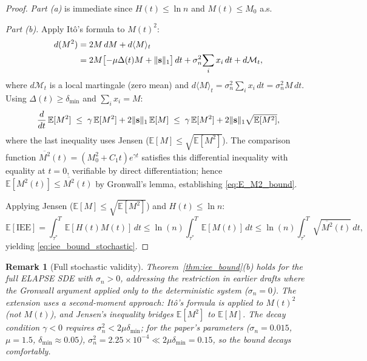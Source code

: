 \documentclass[review,12pt]{elsarticle}
\newcommand{\IEE}{\mathrm{IEE}}
\newtheorem{remark}{Remark}
\begin{document}
\begin{proof}
\emph{Part (a)} is immediate since $H(t) \leq \ln n$ and $M(t) \leq M_0$ a.s.

\emph{Part (b).}
Apply Itô's formula to $M(t)^2$:
\begin{align*}
  d(M^2) &= 2M\,dM + d\langle M\rangle_t \\
  &= 2M\bigl[-\mu\Delta(t)M + \|{\bf s}\|_1\bigr]\,dt
   + \sigma_n^2\!\sum_i x_i\,dt + d\mathcal{M}_t,
\end{align*}
where $d\mathcal{M}_t$ is a local martingale (zero mean) and
$d\langle M\rangle_t = \sigma_n^2\sum_i x_i\,dt = \sigma_n^2 M\,dt$.
Using $\Delta(t) \geq \delta_{\min}$ and $\sum_i x_i = M$:
\[
  \frac{d}{dt}\,\mathbb{E}[M^2]
  \;\leq\; \gamma\,\mathbb{E}[M^2] + 2\|{\bf s}\|_1\,\mathbb{E}[M]
  \;\leq\; \gamma\,\mathbb{E}[M^2] + 2\|{\bf s}\|_1\sqrt{\mathbb{E}[M^2]},
\]
where the last inequality uses Jensen ($\mathbb{E}[M] \leq \sqrt{\mathbb{E}[M^2]}$).
The comparison function $\overline{M^2}(t)=(M_0^2+C_1 t)e^{\gamma t}$
satisfies this differential inequality with equality at $t=0$, verifiable
by direct differentiation; hence $\mathbb{E}[M^2(t)] \leq \overline{M^2}(t)$
by Gronwall's lemma, establishing \eqref{eq:E_M2_bound}.

Applying Jensen ($\mathbb{E}[M] \leq \sqrt{\mathbb{E}[M^2]}$) and
$H(t) \leq \ln n$:
\[
  \mathbb{E}[\IEE] = \int_{\tau^*}^T \!\mathbb{E}[H(t)M(t)]\,dt
  \leq \ln(n)\!\int_{\tau^*}^T\!\mathbb{E}[M(t)]\,dt
  \leq \ln(n)\!\int_{\tau^*}^T\!\sqrt{\overline{M^2}(t)}\,dt,
\]
yielding \eqref{eq:iee_bound_stochastic}.
\end{proof}

\begin{remark}[Full stochastic validity]
\label{rem:thm2_stochastic}
Theorem~\ref{thm:iee_bound}(b) holds for the \emph{full} ELAPSE SDE with
$\sigma_n > 0$, addressing the restriction in earlier drafts where the
Gronwall argument applied only to the deterministic system ($\sigma_n=0$).
The extension uses a second-moment approach: Itô's formula is applied to
$M(t)^2$ (not $M(t)$), and Jensen's inequality bridges $\mathbb{E}[M^2]$ to
$\mathbb{E}[M]$. The decay condition $\gamma < 0$ requires $\sigma_n^2 <
2\mu\delta_{\min}$; for the paper's parameters ($\sigma_n=0.015$, $\mu=1.5$,
$\delta_{\min}\approx 0.05$), $\sigma_n^2 = 2.25\times10^{-4} \ll
2\mu\delta_{\min} = 0.15$, so the bound decays comfortably.
\end{remark}
\end{document}
